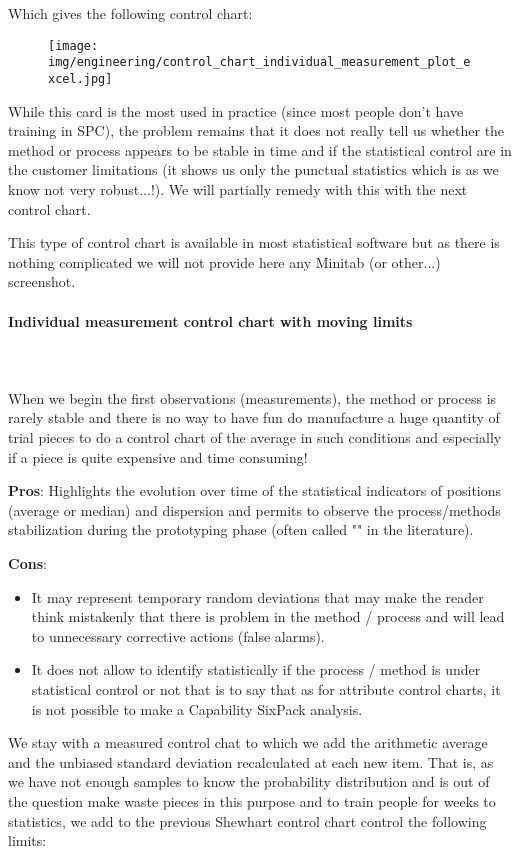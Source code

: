 	Which gives the following control chart:
	\begin{figure}[H]
		\centering
		\texttt{[image: img/engineering/control\_chart\_individual\_measurement\_plot\_excel.jpg]}
	\end{figure}
	While this card is the most used in practice (since most people don't have training in SPC), the problem remains that it does not really tell us whether the method or process appears to be stable in time and if the statistical control are in the customer limitations (it shows us only the punctual statistics which is as we know not very robust...!). We will partially remedy with this with the next control chart.
	
	This type of control chart is available in most statistical software but as there is nothing complicated we will not provide here any Minitab (or other...) screenshot.
	
	\paragraph{Individual measurement control chart with moving limits}\mbox{}\\\\
	When we begin the first observations (measurements), the method or process is rarely stable and there is no way to have fun do manufacture a huge quantity of trial pieces to do a control chart of the average in such conditions and especially if a piece is quite expensive and time consuming!
	
	\textbf{Pros}: Highlights the evolution over time of the statistical indicators of positions (average or median) and dispersion and permits to observe the process/methods stabilization   during the prototyping phase (often called "" in the literature).

	\textbf{Cons}:
	\begin{itemize}
		\item It may represent temporary random deviations that may make the reader think mistakenly that there is problem in the method / process and will lead to unnecessary corrective actions (false alarms). 
		
		\item  It does not allow to identify statistically if the process / method is under statistical control or not that is to say that as for attribute control charts, it is not possible to make a Capability SixPack analysis.
 	\end{itemize}
 	We stay with a measured control chat to which we add the arithmetic average and the unbiased standard deviation recalculated at each new item. That is, as we have not enough samples to know the probability distribution and is out of the question make waste pieces in this purpose and to train people for weeks to statistics, we add to the previous Shewhart control chart control the following limits:
	
